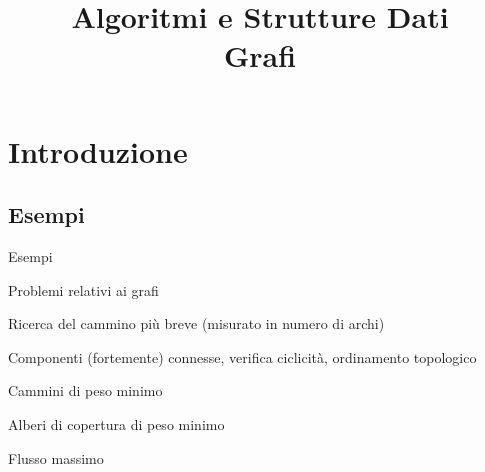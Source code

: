 

\usepackage{blkarray, bigstrut}
\usepackage{listings}

\newcommand\topstrut[1][1.2ex]{\setlength\bigstrutjot{#1}{\bigstrut[t]}}
\newcommand\botstrut[1][0.9ex]{\setlength\bigstrutjot{#1}{\bigstrut[b]}}


\renewcommand{\mmark}{\mathit{visited}}
\renewcommand{\hascycle}{\mathit{hasCycle}}

\title[ASD - Grafi]{\textbf{Algoritmi e Strutture Dati}\\[24pt]
Grafi}

\graphicspath{{figs/09/}}





\FrameTitle{}

\FrameContent

\section{Introduzione}

\subsection{Esempi}

\begin{frame}{Esempi}
\vspace{-8pt}
\centering
{}
\end{frame}

\begin{frame}{Problemi relativi ai grafi}
\begin{myboxtitle}
\BIL
\item Ricerca del cammino più breve (misurato in numero di archi)
\item Componenti (fortemente) connesse, verifica ciclicità, ordinamento topologico
\EIL
\end{myboxtitle}
\medskip
\begin{myboxtitle}
\BIL
\item Cammini di peso minimo
\item Alberi di copertura di peso minimo
\item Flusso massimo
\EIL
\end{myboxtitle}

\end{frame}

